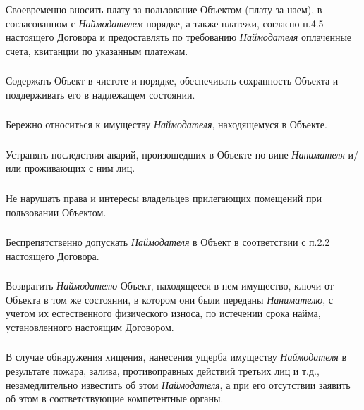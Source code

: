 \documentclass[a4paper, 11pt]{article}
\begin{document}
\subsubsection{} Своевременно вносить плату за пользование Объектом (плату за наем), в
согласованном с \textit{Наймодателем} порядке, а также платежи, согласно п.4.5 настоящего
Договора и предоставлять по требованию \textit{Наймодателя} оплаченные счета, квитанции
по указанным платежам.
\subsubsection{} Содержать Объект в чистоте и порядке, обеспечивать сохранность Объекта и
поддерживать его в надлежащем состоянии.
\subsubsection{} Бережно относиться к имуществу \textit{Наймодателя}, находящемуся в Объекте.
\subsubsection{} Устранять последствия аварий, произошедших в Объекте по вине
\textit{Нанимателя}
и/или проживающих с ним лиц.
\subsubsection{} Не нарушать права и интересы владельцев прилегающих помещений при
пользовании Объектом.
\subsubsection{} Беспрепятственно допускать \textit{Наймодателя} в Объект в соответствии с п.2.2
настоящего Договора.
\subsubsection{} Возвратить \textit{Наймодателю} Объект, находящееся в нем имущество, ключи от
Объекта в том же состоянии, в котором они были переданы \textit{Нанимателю}, с учетом их
естественного физического износа, по истечении срока найма, установленного
настоящим Договором.
\subsubsection{} В случае обнаружения хищения, нанесения ущерба имуществу
\textit{Наймодателя} в
результате пожара, залива, противоправных действий третьих лиц и т.д.,
незамедлительно известить об этом \textit{Наймодателя}, а при его отсутствии заявить об
этом в соответствующие компетентные органы.
\end{document}
